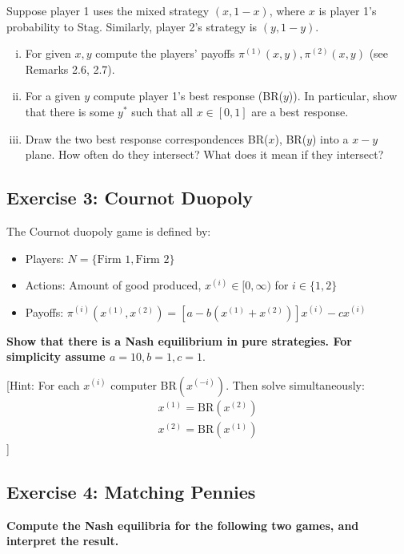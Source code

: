 \documentclass[10pt]{article}
\begin{document}
Suppose player 1 uses the mixed strategy \((x, 1- x)\), where \(x\) is player 1's
probability to Stag. Similarly, player 2's strategy is \((y, 1 - y)\).

\begin{enumerate}[(i)]
    \item For given \(x, y\) compute the players' payoffs \(\pi^{(1)}(x, y),
    \pi^{(2)}(x, y)\) (see Remarks 2.6, 2.7).
    \item For a given \(y\) compute player 1's best response (BR(\(y\))). In
    particular, show that there is some \(y^{*}\) such that all \(x \in [0,
    1]\) are a best response.
    \item Draw the two best response correspondences BR(\(x\)), BR(\(y\)) into a
    \(x-y\) plane. How often do they intersect? What does it mean if they
    intersect?
\end{enumerate}

\subsection*{Exercise 3: Cournot Duopoly}

The Cournot duopoly game is defined by:

\begin{itemize}
    \item Players: \(N = \{\text{Firm } 1, \text{Firm } 2\}\)
    \item Actions: Amount of good produced, \(x^{(i)} \in [0, \infty)\) for \(i \in \{1, 2\}\)
    \item Payoffs: \(\pi^{(i)}(x^{(1)}, x^{(2)}) = [a - b (x^{(1)} + x^{(2)})] x^{(i)} - c x^{(i)}\)
\end{itemize}

\textbf{Show that there is a Nash equilibrium in pure strategies. For simplicity
assume \(a=10, b=1, c=1\)}.

[Hint: For each \(x^{(i)}\) computer BR\((x^{(-i)})\). Then solve simultaneously:
\begin{align*}
    x^{(1)}= \text{BR}(x^{(2)}) \\
    x^{(2)}= \text{BR}(x^{(1)})
\end{align*}
]

\subsection*{Exercise 4: Matching Pennies}

\textbf{Compute the Nash equilibria for the following two games, and interpret the result.}
\end{document}
